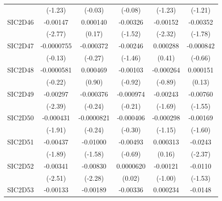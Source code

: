 \begin{table}[htbp]
\begin{tabular}{l*{5}{c}}
            &     (-1.23)         &     (-0.03)         &     (-0.08)         &     (-1.23)         &     (-1.21)         \\
SIC2D46     &    -0.00147\sym{**} &    0.000140         &    -0.00326         &    -0.00152\sym{*}  &    -0.00352         \\
            &     (-2.77)         &      (0.17)         &     (-1.52)         &     (-2.32)         &     (-1.78)         \\
SIC2D47     &  -0.0000755         &   -0.000372         &    -0.00246         &    0.000288         &   -0.000842         \\
            &     (-0.13)         &     (-0.27)         &     (-1.46)         &      (0.41)         &     (-0.66)         \\
SIC2D48     &  -0.0000581         &    0.000469         &    -0.00103         &   -0.000264         &    0.000151         \\
            &     (-0.22)         &      (0.90)         &     (-0.92)         &     (-0.89)         &      (0.13)         \\
SIC2D49     &    -0.00297\sym{*}  &   -0.000376         &   -0.000974         &    -0.00243         &    -0.00760         \\
            &     (-2.39)         &     (-0.24)         &     (-0.21)         &     (-1.69)         &     (-1.55)         \\
SIC2D50     &   -0.000431         &  -0.0000821         &   -0.000406         &   -0.000298         &    -0.00169         \\
            &     (-1.91)         &     (-0.24)         &     (-0.30)         &     (-1.15)         &     (-1.60)         \\
SIC2D51     &    -0.00437         &    -0.01000         &    -0.00493         &    0.000313         &     -0.0243\sym{*}  \\
            &     (-1.89)         &     (-1.58)         &     (-0.69)         &      (0.16)         &     (-2.37)         \\
SIC2D52     &    -0.00341\sym{*}  &    -0.00830\sym{*}  &   0.0000620         &    -0.00121         &     -0.0110         \\
            &     (-2.51)         &     (-2.28)         &      (0.02)         &     (-1.00)         &     (-1.53)         \\
SIC2D53     &    -0.00133         &    -0.00189         &    -0.00336         &    0.000234         &     -0.0148         \\

\end{tabular}
\end{table}
